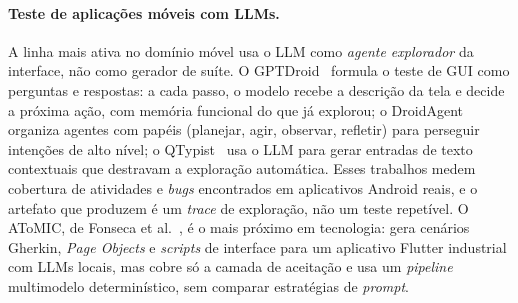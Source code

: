 \documentclass[12pt]{article}
\begin{document}
\paragraph{Teste de aplicações móveis com LLMs.} A linha mais ativa no
domínio móvel usa o LLM como \emph{agente explorador} da interface, não como
gerador de suíte. O GPTDroid~\cite{liu2024gptdroid} formula o teste de GUI
como perguntas e respostas: a cada passo, o modelo recebe a descrição da
tela e decide a próxima ação, com memória funcional do que já explorou; o
DroidAgent~\cite{yoon2024droidagent} organiza agentes com papéis (planejar,
agir, observar, refletir) para perseguir intenções de alto nível; o
QTypist~\cite{liu2023qtypist} usa o LLM para gerar entradas de texto
contextuais que destravam a exploração automática. Esses trabalhos medem
cobertura de atividades e \textit{bugs} encontrados em aplicativos Android
reais, e o artefato que produzem é um \textit{trace} de exploração, não um
teste repetível. O AToMIC, de Fonseca et al.~\cite{fonseca2025atomic}, é o
mais próximo em tecnologia: gera cenários Gherkin, \textit{Page Objects} e
\textit{scripts} de interface para um aplicativo Flutter industrial com LLMs
locais, mas cobre só a camada de aceitação e usa um \textit{pipeline}
multimodelo determinístico, sem comparar estratégias de \textit{prompt}.
\end{document}
